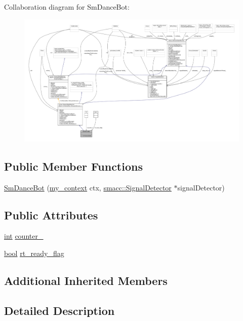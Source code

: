 Collaboration diagram for Sm\+Dance\+Bot\+:
\nopagebreak
\begin{figure}[H]
\begin{center}
\leavevmode
\includegraphics[width=350pt]{structSmDanceBot__coll__graph}
\end{center}
\end{figure}
\subsection*{Public Member Functions}
\begin{DoxyCompactItemize}
\item 
\hyperlink{structSmDanceBot_a19d56ccf5c40bc65cb58be2e6c55d74c}{Sm\+Dance\+Bot} (\hyperlink{common_8h_af2dcacead80d69b96952496fe413bbfe}{my\+\_\+context} ctx, \hyperlink{classsmacc_1_1SignalDetector}{smacc\+::\+Signal\+Detector} $\ast$signal\+Detector)
\end{DoxyCompactItemize}
\subsection*{Public Attributes}
\begin{DoxyCompactItemize}
\item 
\hyperlink{classint}{int} \hyperlink{structSmDanceBot_a9125df831508b9d16e747993c546f771}{counter\+\_}
\item 
\hyperlink{classbool}{bool} \hyperlink{structSmDanceBot_a4943f893a4f3184a78cf379b143cc7ed}{rt\+\_\+ready\+\_\+flag}
\end{DoxyCompactItemize}
\subsection*{Additional Inherited Members}


\subsection{Detailed Description}


